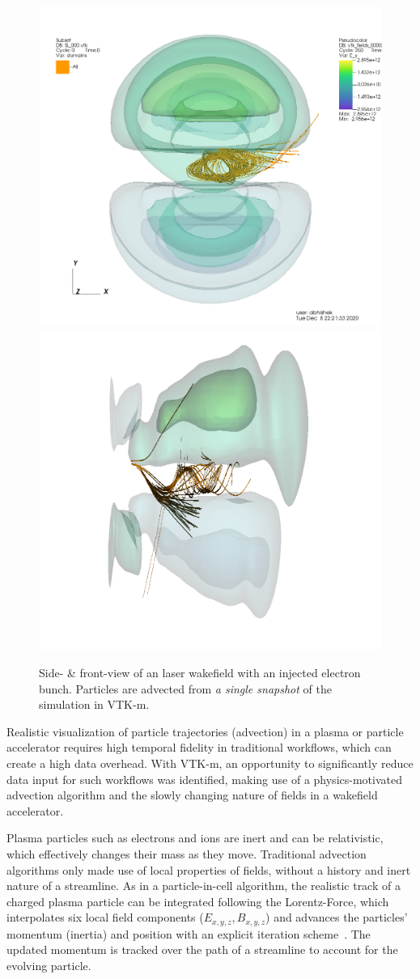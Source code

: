 \begin{figure}[ht]
  \centering
  \includegraphics[width=0.49\linewidth]{figures/lwfa_particle_advection_front.png}%
  \includegraphics[width=0.49\linewidth]{figures/lwfa_particle_advection_side.png}
  \caption{Side- \& front-view of an laser wakefield with an injected electron bunch.
  Particles are advected from \emph{a single snapshot} of the simulation in VTK-m.}
  \label{fig:lwfa_particle_advection}
\end{figure}

Realistic visualization of particle trajectories (advection) in a plasma or particle accelerator requires high temporal fidelity in traditional workflows, which can create a high data overhead.
With VTK-m, an opportunity to significantly reduce data input for such workflows was identified, making use of a physics-motivated advection algorithm and the slowly changing nature of fields in a wakefield accelerator.

Plasma particles such as electrons and ions are inert and can be relativistic, which effectively changes their mass as they move.
Traditional advection algorithms only made use of local properties of fields, without a history and inert nature of a streamline.
As in a particle-in-cell algorithm, the realistic track of a charged plasma particle can be integrated following the Lorentz-Force, which interpolates six local field components ($E_{x,y,z}, B_{x,y,z}$) and advances the particles' momentum (inertia) and position with an explicit iteration scheme~\cite{Boris1970}.
The updated momentum is tracked over the path of a streamline to account for the evolving particle.

